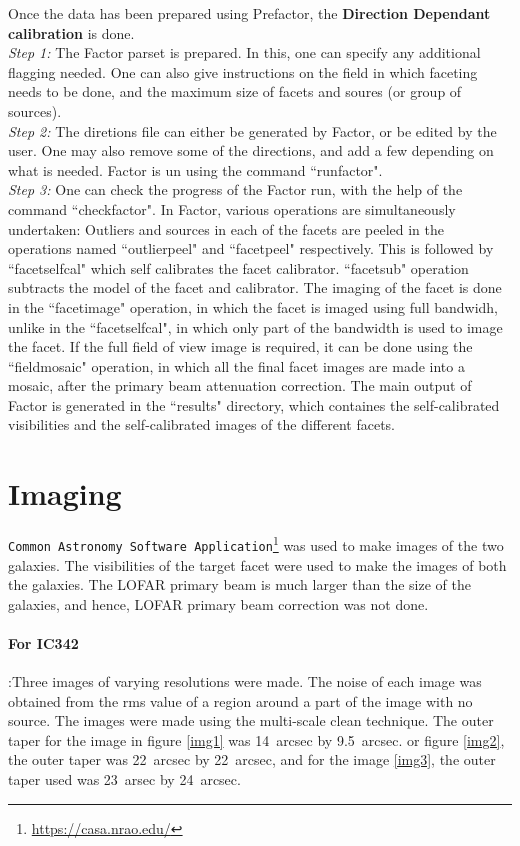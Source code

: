 \documentclass[../main/thesis_msc.tex]{subfiles}
\begin{document}
\noindent Once the data has been prepared using Prefactor, the \textbf{Direction Dependant calibration} is done. \\
\textit{Step 1: }The Factor parset is prepared. In this, one can specify any additional flagging needed. One can also give instructions on the field in which faceting needs to be done, and the maximum size of facets and soures (or group of sources).  \\
\textit{Step 2:} The diretions file can either be generated by Factor, or be edited by the user. One may also remove some of the directions, and add a few depending on what is needed. Factor is un using the command ``runfactor". \\
\textit{Step 3:} One can check the progress of the Factor run, with the help of the command ``checkfactor". In Factor, various operations are simultaneously undertaken: Outliers and sources in each of the facets are peeled in the operations named ``outlierpeel" and ``facetpeel" respectively. This is followed by ``facetselfcal" which self calibrates the facet calibrator. ``facetsub" operation subtracts the model of the facet and calibrator. The imaging of the facet is done in the ``facetimage" operation, in which the facet is imaged using full bandwidh, unlike in the ``facetselfcal", in which only part of the bandwidth is used to image the facet. If the full field of view image is required, it can be done using the ``fieldmosaic" operation, in which all the final facet images are made into a mosaic, after the primary beam attenuation correction. The main output of Factor is generated in the ``results" directory, which containes the self-calibrated visibilities and the self-calibrated images of the different facets. 


\section{Imaging}
\verb|Common Astronomy Software Application|\footnote{\url{https://casa.nrao.edu/}} was used to make images of the two galaxies. The visibilities of the target facet were used to make the images of both the galaxies. The LOFAR primary beam is much larger than the size of the galaxies, and hence, LOFAR primary beam correction was not done.  
\paragraph{For IC342}:Three images of varying resolutions were made. The noise of each image was obtained from the rms value of a region around a part of the image with no source. The images were made using the multi-scale clean technique. The outer taper for the image in figure \ref{img1} was 14~arcsec by 9.5~arcsec. or figure \ref{img2}, the outer taper was 22~arcsec by 22~arcsec, and for the image \ref{img3}, the outer taper used was 23~arsec by 24~arcsec.
\end{document}
